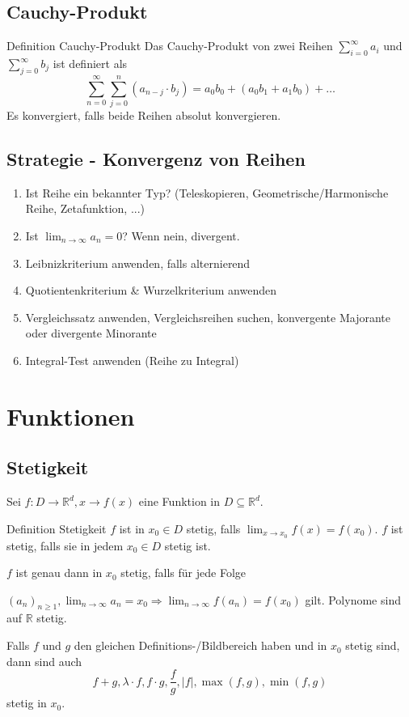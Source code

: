 \documentclass[a4paper,10pt]{article}
\def\limn{\lim_{n\to \infty}}
\def\R{\mathbb{R}}
\begin{document}
\subsection{Cauchy-Produkt}
\begin{subbox}{Definition Cauchy-Produkt}
  Das Cauchy-Produkt von zwei Reihen $\sum_{i = 0}^\infty a_i$ und $\sum_{j = 0}^\infty b_j$ ist definiert als
  $$\sum_{n=0}^\infty \sum_{j=0}^n (a_{n-j} \cdot b_j) = a_0b_0 + (a_0b_1 + a_1b_0) + \ldots$$ Es konvergiert, falls beide Reihen absolut konvergieren.
\end{subbox}

\subsection{Strategie - Konvergenz von Reihen}
\begin{enumerate}
 \item Ist Reihe ein bekannter Typ? (Teleskopieren, Geometrische/Harmonische Reihe, Zetafunktion, ...)
 \item Ist $\limn a_n = 0$? Wenn nein, divergent.
 \item Leibnizkriterium anwenden, falls alternierend
 \item Quotientenkriterium \& Wurzelkriterium anwenden
 \item Vergleichssatz anwenden, Vergleichsreihen suchen, konvergente Majorante oder divergente Minorante
 \item Integral-Test anwenden (Reihe zu Integral)
\end{enumerate}

\section{Funktionen}
\subsection{Stetigkeit}
Sei $f : D \to \R^d, x \to f(x)$ eine Funktion in $D \subseteq \R^d$.
\begin{mainbox}{Definition Stetigkeit}
 $f$ ist in $x_0 \in D$ stetig, falls $\lim_{x\to x_0} f(x) = f(x_0)$.
 $f$ ist stetig, falls sie in jedem $x_0 \in D$ stetig ist.
\end{mainbox}

$f$ ist genau dann in $x_0$ stetig, falls für jede Folge \par $(a_n)_{n\geq 1}, \limn a_n = x_0 \Rightarrow \limn f(a_n) = f(x_0)$ gilt. Polynome sind auf $\R$ stetig.
\begin{subbox}{}
 Falls $f$ und $g$ den gleichen Definitions-/Bildbereich haben und in $x_0$ stetig sind, dann sind auch $$f + g, \lambda \cdot f, f \cdot g, \frac{f}{g}, |f|, \max(f,g), \min(f,g)$$ stetig in $x_0$.
\end{subbox}
\end{document}
